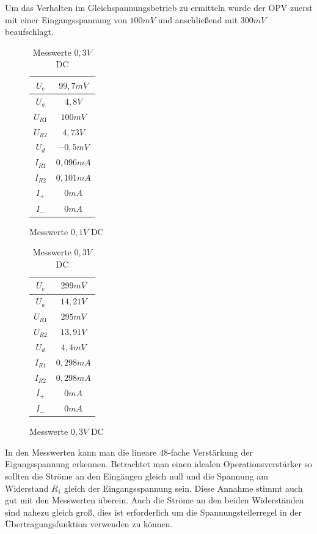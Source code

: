 Um das Verhalten im Gleichspannungsbetrieb zu ermitteln wurde der OPV zuerst mit einer Eingangsspannung von $100mV$ und anschließend
mit $300mV$ beaufschlagt.\\

\begin{table}[H]
\begin{minipage}{.5\textwidth}
\begin{figure}[H]
\centering
 \begin{tabular}{c|c}
  $U_e$ & $99,7mV$ \\ \hline
  $U_a$ & $4,8V$ \\ \hline
  $U_{R1}$ & $100mV$ \\ \hline
  $U_{R2}$ & $4,73V$ \\ \hline
  $U_d$ & $-0,5mV$ \\ \hline
  $I_{R1}$ & $0,096mA$ \\ \hline
  $I_{R2}$ & $0,101mA$ \\ \hline
  $I_+$ & $0mA$ \\ \hline
  $I_-$ & $0mA$ \\
 \end{tabular}
  \caption{Messwerte $0,1V$ DC}
\end{figure}
\end{minipage}
\begin{minipage}{.5\textwidth}
\begin{figure}[H]
  \centering
 \begin{tabular}{c|c}
  $U_e$ & $299mV$ \\ \hline
  $U_a$ & $14,21V$ \\ \hline
  $U_{R1}$ & $295mV$ \\ \hline
  $U_{R2}$ & $13,91V$ \\ \hline
  $U_d$ & $4,4mV$ \\ \hline
  $I_{R1}$ & $0,298mA$ \\ \hline
  $I_{R2}$ & $0,298mA$ \\ \hline
  $I_+$ & $0mA$ \\ \hline
  $I_-$ & $0mA$ \\
 \end{tabular}
 \caption{Messwerte $0,3V$ DC}
\end{figure}
\end{minipage}
\end{table}
\noindent
In den Messwerten kann man die lineare 48-fache Verstärkung der Eigangsspannung erkennen. Betrachtet man einen
idealen Operationsverstärker so sollten die Ströme an den Eingängen gleich null und die Spannung am Widerstand $R_1$ 
gleich der Eingangsspannung sein. Diese Annahme stimmt auch gut mit den Messwerten überein. Auch die Ströme an den 
beiden Widerständen sind nahezu gleich groß, dies ist erforderlich um die Spannungsteilerregel in der Übertragungsfunktion 
verwenden zu können.\\

